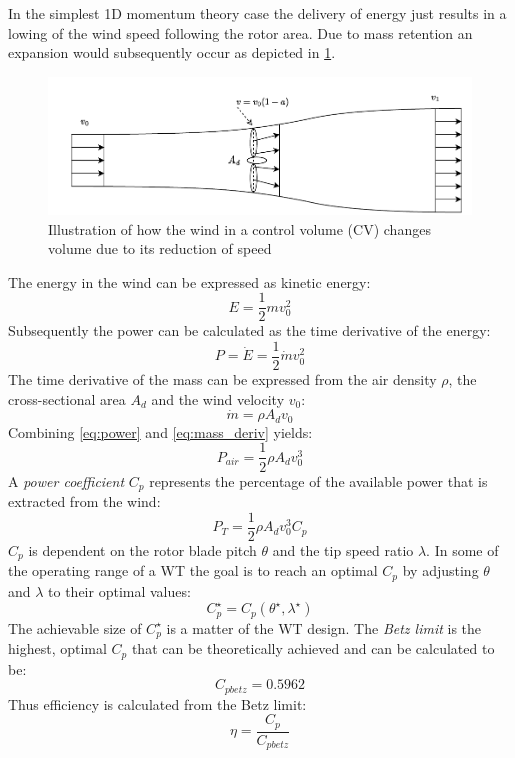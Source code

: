 In the simplest 1D momentum theory case the delivery of energy just results in a lowing of the wind speed following the rotor area. Due to mass retention an expansion would subsequently occur as depicted in \cref{fig:betz}.
\begin{figure}[h]
	\centering
	\includegraphics[width=0.8\linewidth]{Graphics/FlowThroughRotor.pdf}
	\caption{Illustration of how the wind in a control volume (CV) changes volume due to its reduction of speed}
	\label{fig:betz}
\end{figure}
The energy in the wind can be expressed as kinetic energy:
\begin{equation} \label{eq:energy}
	E = \dfrac{1}{2} m v_0^2
\end{equation}
Subsequently the power can be calculated as the time derivative of the energy:
\begin{equation} \label{eq:power}
	P = \dot{E} = \dfrac{1}{2} \dot{m} v_0^2
\end{equation}
The time derivative of the mass can be expressed from the air density $ \rho $, the cross-sectional area $ A_d $ and the wind velocity $ v_0 $:
\begin{equation}\label{eq:mass_deriv}
	\dot{m} = \rho A_d v_0
\end{equation}
Combining \cref{eq:power} and \cref{eq:mass_deriv} yields:
\begin{equation}\label{eq:power2}
	P_{air} = \dfrac{1}{2} \rho A_d v_0^3
\end{equation}
A \textit{power coefficient} $ C_p $ represents the percentage of the available power that is extracted from the wind:
\begin{equation}\label{eq:power_w_Cp}
	P_{T} = \dfrac{1}{2} \rho A_d v_0^3 C_p
\end{equation}
$ C_p $ is dependent on the rotor blade pitch $ \theta $ and the tip speed ratio $ \lambda $. In some of the operating range of a WT the goal is to reach an optimal $ C_p $ by adjusting $ \theta $ and  $ \lambda $ to their optimal values:
\begin{equation}\label{eq:cp_optimal}
	C_p^\star = C_p(\theta^\star, \lambda^\star)
\end{equation}
 The achievable size of $ C_p^\star $ is a matter of the WT design. The \textit{Betz limit} is the highest, optimal $ C_p $ that can be theoretically achieved and can be calculated to be:
\begin{equation}\label{eq:betzlimit}
	C_{pbetz} = 0.5962
\end{equation}
Thus efficiency is calculated from the Betz limit:
\begin{equation}\label{eq:efficiency}
	\eta = \dfrac{C_p}{C_{pbetz}}
\end{equation}


